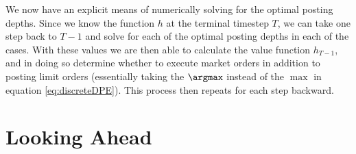 \documentclass[12pt]{article}
\begin{document}
We now have an explicit means of numerically solving for the optimal posting depths. Since we know the function $h$ at the terminal timestep $T$, we can take one step back to $T-1$ and solve for each of the optimal posting depths in each of the cases. With these values we are then able to calculate the value function $h_{T-1}$, and in doing so determine whether to execute market orders in addition to posting limit orders (essentially taking the $\argmax$ instead of the $\max$ in equation \ref{eq:discreteDPE}). This process then repeats for each step backward.
\section*{Looking Ahead}
\end{document}

